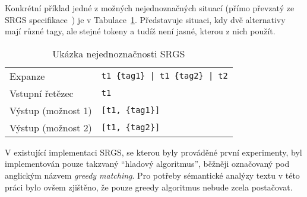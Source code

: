 Konkrétní příklad jedné z možných nejednoznačných situací (přímo převzatý ze SRGS specifikace~\cite{srgs}) je v Tabulace~\ref{tab:ambiguity_example}.
Představuje situaci, kdy dvě alternativy mají různé tagy, ale stejné tokeny a tudíž není jasné, kterou z nich použít.
\begin{table}[ht!]
	\centering
	\begin{tabular}{|l|l|}
		\hline
		Expanze            & \texttt{t1 \{tag1\} | t1 \{tag2\} | t2} \\
		Vstupní řetězec    & \texttt{t1}                             \\
		Výstup (možnost 1) & \texttt{[{t1}, \{tag1\}]}               \\
		Výstup (možnost 2) & \texttt{[{t1}, \{tag2\}]}               \\
		\hline
	\end{tabular}
	\caption{Ukázka nejednoznačnosti SRGS}\label{tab:ambiguity_example}
\end{table}

V existující implementaci SRGS, se kterou byly prováděné první experimenty, byl implementován pouze takzvaný \enquote{hladový algoritmus}, běžněji označovaný pod anglickým názvem \emph{greedy matching}.
Pro potřeby sémantické analýzy textu v této práci bylo ovšem zjištěno, že pouze greedy algoritmus nebude zcela postačovat.

